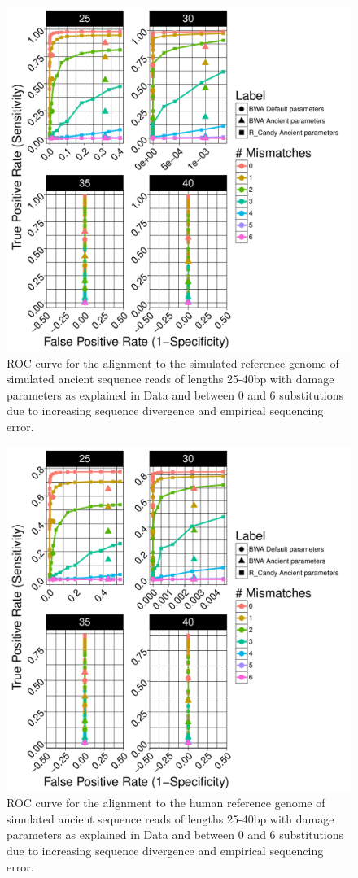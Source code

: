 \documentclass[11pt,a4paper]{report}
\begin{document}
\begin{figure}[H]
\centering
\includegraphics[width=12cm]{pictures/bROC_DS1_ART.pdf}
\caption{
ROC curve for the alignment to the simulated reference genome of simulated ancient 
sequence reads of lengths 25-40bp with damage parameters as explained in Data 
and between 0 and 6 substitutions due to increasing sequence divergence and
empirical sequencing error.
}
\label{DS1_ART}
\end{figure}



\begin{figure}[H]
\centering
\includegraphics[width=12cm]{pictures/bROC_DS4_ART.pdf}
\caption{
ROC curve for the alignment to the human reference genome of simulated ancient 
sequence reads of lengths 25-40bp with damage parameters as explained in Data 
and between 0 and 6 substitutions due to increasing sequence divergence and
empirical sequencing error.
}
\label{DS4_ART}
\end{figure}





\end{document}
